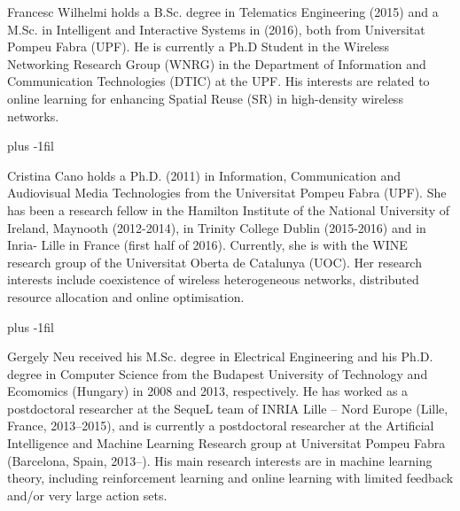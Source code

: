 \documentclass[10pt,journal,compsoc]{IEEEtran}
\begin{document}
	\begin{IEEEbiography}{Francesc Wilhelmi} holds a B.Sc. degree in Telematics Engineering (2015) and a M.Sc. in Intelligent and Interactive Systems in (2016), both from Universitat Pompeu Fabra (UPF). He is currently a Ph.D Student in the Wireless Networking Research Group (WNRG) in the Department of Information and Communication Technologies (DTIC) at the UPF. His interests are related to online learning for enhancing Spatial Reuse (SR) in high-density wireless networks.
	\end{IEEEbiography}
	\vskip -20pt plus -1fil
	\begin{IEEEbiography}{Cristina Cano} holds a Ph.D. (2011) in Information, Communication and Audiovisual Media Technologies from the Universitat Pompeu Fabra (UPF). She has been a research fellow in the Hamilton Institute of the National University of Ireland, Maynooth (2012-2014), in Trinity College Dublin (2015-2016) and in Inria- Lille in France (first half of 2016). Currently, she is with the WINE research group of the Universitat Oberta de Catalunya (UOC). Her research interests include coexistence of wireless heterogeneous networks, distributed resource allocation and online optimisation. 
	\end{IEEEbiography}
	\vskip -20pt plus -1fil
	\begin{IEEEbiography}{Gergely Neu} received his M.Sc. degree in Electrical Engineering and his Ph.D. degree in Computer Science from the Budapest University of Technology and Ecomomics (Hungary) in 2008 and 2013, respectively. He has worked as a postdoctoral researcher at the SequeL team of INRIA Lille -- Nord Europe (Lille, France, 2013--2015), and is currently a postdoctoral researcher at the Artificial Intelligence and Machine Learning Research group at Universitat Pompeu Fabra (Barcelona, Spain, 2013--). His main research interests are in machine learning theory, including reinforcement learning and online learning with limited feedback and/or very large action sets.
	\end{IEEEbiography}	
\end{document}
